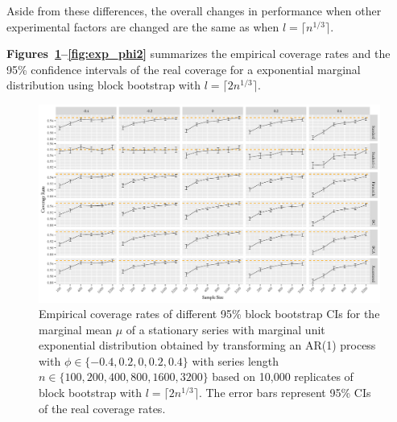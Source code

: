 \documentclass[12pt]{article}
\begin{document}
Aside from these differences, the overall changes
in performance when other experimental factors are changed are the same as
when $l = \lceil n^{1/3} \rceil$.

\textbf{Figures~\ref{fig:exp_mu2}--\ref{fig:exp_phi2}} 
summarizes the empirical coverage rates and the 95\% confidence intervals of the 
real coverage for a exponential marginal distribution using block bootstrap
with $l = \lceil 2n^{1/3} \rceil$.

\begin{figure}[tbp]
  \centering
  \includegraphics[width=\textwidth]{figures/plot_exp_mu_2}
  \caption{Empirical coverage rates of different 95\% block bootstrap CIs for
    the marginal mean $\mu$ of a stationary series with marginal unit exponential
    distribution obtained by transforming an AR(1) process with
    $\phi \in \{-0.4, 0.2, 0, 0.2, 0.4\}$ with series length
    $n \in \{100, 200, 400, 800, 1600, 3200\}$ based on 10,000 replicates of
    block bootstrap with $l = \lceil 2n^{1/3} \rceil$. 
    The error bars represent 95\% CIs of the real coverage rates.}
  \label{fig:exp_mu2}
\end{figure}
\end{document}
